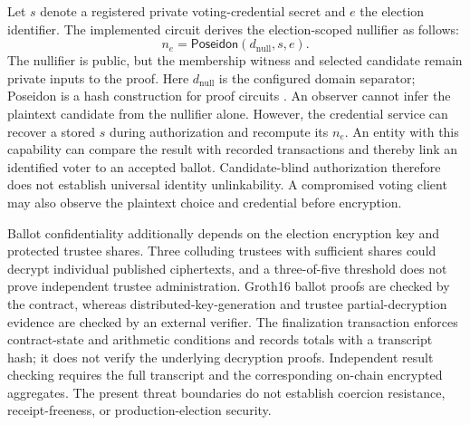 Let $s$ denote a registered private voting-credential secret and $e$ the election
identifier. The implemented circuit derives the election-scoped nullifier as
follows:
\begin{equation}
  n_e = \mathsf{Poseidon}(d_{\mathrm{null}},s,e).
  \label{eq:system-nullifier}
\end{equation}
The nullifier is public, but the membership witness and selected candidate remain
private inputs to the proof. Here $d_{\mathrm{null}}$ is the configured domain
separator; Poseidon is a hash construction for proof circuits
\citep{grassi2021poseidon}. An observer cannot infer the plaintext candidate from
the nullifier alone. However, the credential service can recover a stored $s$
during authorization and recompute its $n_e$. An entity with this capability can
compare the result with recorded transactions and thereby link an identified voter
to an accepted ballot. Candidate-blind authorization therefore does not establish
universal identity unlinkability. A compromised voting client may also observe the
plaintext choice and credential before encryption.

Ballot confidentiality additionally depends on the election encryption key and
protected trustee shares. Three colluding trustees with sufficient shares could
decrypt individual published ciphertexts, and a three-of-five threshold does not
prove independent trustee administration. Groth16 ballot proofs are checked by the
contract, whereas distributed-key-generation and trustee partial-decryption
evidence are checked by an external verifier. The finalization transaction enforces
contract-state and arithmetic conditions and records totals with a transcript hash;
it does not verify the underlying decryption proofs. Independent result checking
requires the full transcript and the corresponding on-chain encrypted aggregates.
The present threat boundaries do not establish coercion resistance,
receipt-freeness, or production-election security.
